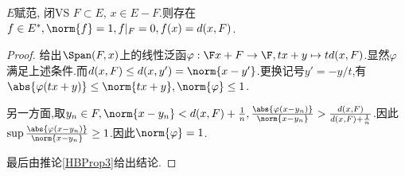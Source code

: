 \documentclass{article}
\begin{document}
\begin{proposition}
    $E$赋范, 闭VS $F\subset E$, $x\in E-F$.则存在$f\in E^*, \norm{f}=1, f|_F=0, f(x)=d(x,F)$.
\end{proposition}
\begin{proof}
    给出$\Span(F,x)$上的线性泛函$\varphi:\F x+F\to \F, tx+y\mapsto td(x,F)$.显然$\varphi$满足上述条件.而$d(x,F)\leq d(x,y')=\norm{x-y'}$.更换记号$y'=-y/t$,有$\abs{\varphi(tx+y)}\leq \norm{tx+y}, \norm{\varphi}\leq 1$.

    另一方面,取$y_n\in F, \norm{x-y_n}<d(x,F)+\frac{1}{n}, \frac{\abs{\varphi(x-y_n)}}{\norm{x-y_n}}>\frac{d(x,F)}{d(x,F)+\frac{1}{n}}$.因此$\sup \frac{\abs{\varphi(x-y_n)}}{\norm{x-y_n}}\geq 1$.因此$\norm{\varphi}=1$.

    最后由推论\ref{HBProp3}给出结论.
\end{proof}
\end{document}
